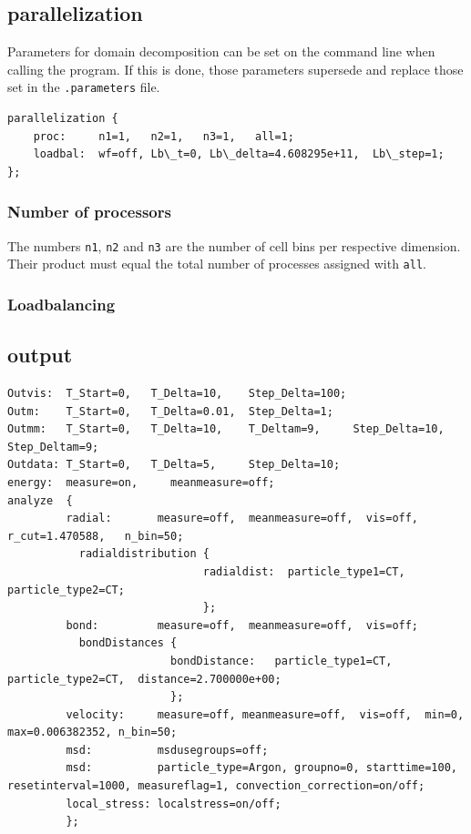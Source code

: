 

\subsection{parallelization}
\label{sub:parallelization}
Parameters for domain decomposition can be set on the command line when calling the program. If this is done, those parameters supersede and replace those set in the 
{\tt .parameters} file.

\begin{lstlisting}
parallelization {
    proc:     n1=1,   n2=1,   n3=1,   all=1;
    loadbal:  wf=off, Lb\_t=0, Lb\_delta=4.608295e+11,  Lb\_step=1;
};
\end{lstlisting}
\subsubsection{Number of processors}
The numbers {\tt n1}, {\tt n2} and {\tt n3} are the number of cell bins per respective dimension. Their product must equal the total number of processes assigned with {\tt all}.
\subsubsection{Loadbalancing}

\subsection{output}
\label{sub:output}
\begin{lstlisting}
Outvis:  T_Start=0,   T_Delta=10,    Step_Delta=100;
Outm:    T_Start=0,   T_Delta=0.01,  Step_Delta=1;
Outmm:   T_Start=0,   T_Delta=10,    T_Deltam=9,     Step_Delta=10,  Step_Deltam=9;
Outdata: T_Start=0,   T_Delta=5,     Step_Delta=10;
energy:  measure=on,     meanmeasure=off;
analyze  {
         radial:       measure=off,  meanmeasure=off,  vis=off,  r_cut=1.470588,   n_bin=50;
           radialdistribution {
                              radialdist:  particle_type1=CT,  particle_type2=CT;
                              };
         bond:         measure=off,  meanmeasure=off,  vis=off;
           bondDistances {
                         bondDistance:   particle_type1=CT,  particle_type2=CT,  distance=2.700000e+00;
                         };
         velocity:     measure=off, meanmeasure=off,  vis=off,  min=0,  max=0.006382352, n_bin=50;
         msd:          msdusegroups=off;
         msd:          particle_type=Argon, groupno=0, starttime=100, resetinterval=1000, measureflag=1, convection_correction=on/off;
         local_stress: localstress=on/off;
         };
\end{lstlisting}

